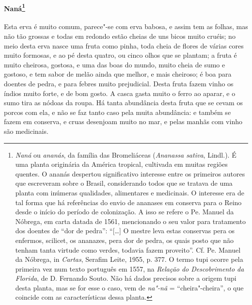 \paragraph{Naná\footnote{ \textit{Naná} ou \textit{ananás}, 
da família das Bromeliáceas (\textit{Ananassa sativa}, Lindl.). É uma
planta originária da América tropical, cultivada em muitas regiões
quentes. O ananás despertou significativo interesse entre os primeiros
autores que escreveram sobre o Brasil, considerando todos que se
tratava de uma planta com inúmeras qualidades, alimentares e
medicinais. O interesse era de tal forma que há referências do envio de
ananases em conserva para o Reino desde o início do período de
colonização. A isso se refere o Pe. Manuel da Nóbrega, em carta datada
de 1561, mencionando o seu valor para tratamento dos doentes de ``dor
de pedra'': ``[\ldots{}] O mestre leva estas conservas pera os enfermos,
scilicet, os ananazes, pera dor de pedra, os quais posto que não tenham
tanta virtude como verdes, todavia fazem proveito''. Cf. Pe. Manuel da
Nóbrega, in \textit{Cartas}, Serafim Leite, 1955, p. 377. O termo tupi
ocorre pela primeira vez num texto português em 1557, na
\textit{Relação do Descobrimento da Florida}, de D. Fernando Souto. Não
há dados precisos sobre a origem tupi desta planta, mas se for esse o
caso, vem de \textit{na"-nã} = ``cheira"-cheira'', o que coincide com as
características dessa planta.}} Esta erva é muito comum,
parece"-se com erva babosa, e assim tem as folhas, mas não tão grossas e
todas em redondo estão cheias de uns bicos muito cruéis; no meio desta
erva nasce uma fruta como pinha, toda cheia de flores de várias cores
muito formosas, e ao pé desta quatro, ou cinco olhos que se plantam; a
fruta é muito cheirosa, gostosa, e uma das boas do mundo, muito cheia
de sumo e gostoso, e tem sabor de melão ainda que melhor, e mais
cheiroso; é boa para doentes de pedra, e para febres muito prejudicial.
Desta fruta fazem vinho os índios muito forte, e de bom gosto. A casca
gasta muito o ferro ao aparar, e o sumo tira as nódoas da roupa. Há
tanta abundância desta fruta que se cevam os porcos com ela, e não se
faz tanto caso pela muita abundância: e também se fazem em conserva, e
cruas desenjoam muito no mar, e pelas manhãs com vinho são \mbox{medicinais.} 

